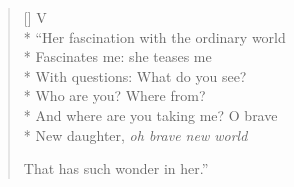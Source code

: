 \begin{verse}[\versewidth]
V\\*
``Her fascination with the ordinary world\\*
Fascinates me: she teases me\\*
With questions: What do you see?\\*
Who are you? Where from?\\*
And where are you taking me? O brave\\*
New daughter, \textit{oh brave new world}

That has such wonder in her.''
\end{verse}
